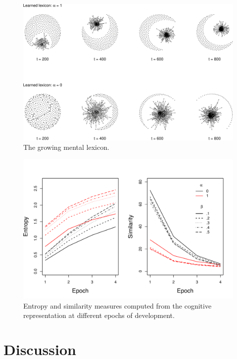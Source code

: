 \documentclass[
  man]{apa6}
\begin{document}
\begin{figure}
\centering
\includegraphics{Enrichment_files/figure-latex/fig2-1.pdf}
\caption{\label{fig:fig2}The growing mental lexicon.}
\end{figure}

\begin{figure}

{\centering \includegraphics[width=1\linewidth]{EntropySim} 

}

\caption{Entropy and similarity measures computed from the cognitive representation at different epochs of development.}\label{fig:unnamed-chunk-1}
\end{figure}

\hypertarget{discussion}{%
\section{Discussion}\label{discussion}}
\end{document}
